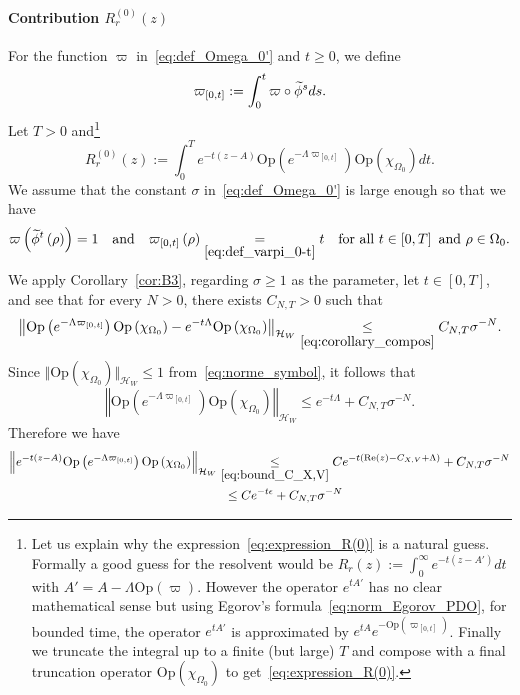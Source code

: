 \documentclass[AHL,Unicode,longabstracts,published]{cedram}
\newcommand{\clH}{\mathcal{H}}
\newcommand{\Ree}{\mathrm{Re}}
\newcommand{\Opp}{\mathrm{Op}}
\let\oldtilde\tilde
\renewcommand*{\tilde}[1]{\mathchoice{\widetilde{#1}}{\widetilde{#1}}{\oldtilde{#1}}{\oldtilde{#1}}}
\newcommand{\Ree}{\mathrm{Re}}
\newcommand{\clH}{\mathcal{H}}
\begin{document}
\paragraph{Contribution $R_{r}^{(0)}(z)$}\label{par:Contribution}

For the function $\varpi$ in~\eqref{eq:def_Omega_0'} and $t\geq0$, we define
\begin{equation}\label{eq:def_varpi_0-t}
\varpi_{\left[0,t\right]}:=\int_{0}^{t}\varpi\circ\tilde{\phi}^{s}ds.
\end{equation}
Let $T>0$ and\footnote{Let us explain why the expression~\eqref{eq:expression_R(0)} is a natural guess. Formally a good guess for the resolvent would be $R_{r}(z):=\int_{0}^{\infty}e^{-t(z-A')}dt$ with $A'=A-\Lambda\Opp (\varpi)$. However the operator $e^{tA'}$ has no clear mathematical sense but using Egorov's formula~\eqref{eq:norm_Egorov_PDO}, for bounded time, the operator $e^{tA'}$ is approximated by $e^{tA}e^{-\Opp (\varpi_{[0,t]})}$. Finally we truncate the integral up to a finite (but large) $T$ and compose with a final truncation operator $\Opp (\chi_{\Omega_{0}})$ to get~\eqref{eq:expression_R(0)}.}
\begin{equation}\label{eq:expression_R(0)}
R_{r}^{\left(0\right)}\left(z\right):=\int_{0}^{T}e^{-t\left(z-A\right)}\Opp \left(e^{-\Lambda\varpi_{\left[0,t\right]}}\right)\Opp \left(\chi_{\Omega_{0}}\right)dt.
\end{equation}
We assume that the constant $\sigma$ in~\eqref{eq:def_Omega_0'} is large enough so that we have
\[
\varpi\left(\tilde{\phi}^{t}\left(\rho\right)\right)=1\quad\text{and}\quad\varpi_{\left[0,t\right]}\left(\rho\right)\underset{\eqref{eq:def_varpi_0-t}}{=}t\quad\text{for all }t\in\left[0,T\right]\text{ and }\rho\in\Omega_{0}.
\]
We apply Corollary~\ref{cor:B3}, regarding $\sigma\geq1$ as the parameter, let $t\in[0,T]$, and see that for every $N>0$, there exists $C_{N,T}>0$ such that
\[
\left\Vert \Opp \left(e^{-\Lambda\varpi_{\left[0,t\right]}}\right)\Opp \left(\chi_{\Omega_{0}}\right)-e^{-t\Lambda}\Opp \left(\chi_{\Omega_{0}}\right)\right\Vert _{\clH _{W}}\underset{\eqref{eq:corollary_compos}}{\leq}C_{N,T}\sigma^{-N}.
\]
Since $\Vert \Opp (\chi_{\Omega_{0}})\Vert _{\clH _{W}}\leq1$ from~\eqref{eq:norme_symbol}, it follows that
\[
\left\Vert \Opp \left(e^{-\Lambda\varpi_{\left[0,t\right]}}\right)\Opp \left(\chi_{\Omega_{0}}\right)\right\Vert _{\clH _{W}}\leq e^{-t\Lambda}+C_{N,T}\sigma^{-N}.
\]
Therefore we have
\begin{equation}\label{eq:res5}
\begin{split}
\left\Vert e^{-t\left(z-A\right)}\Opp \left(e^{-\Lambda\varpi_{\left[0,t\right]}}\right)\Opp \left(\chi_{\Omega_{0}}\right)\right\Vert _{\clH _{W}} & \underset{\eqref{eq:bound_C_X,V}}{\leq}Ce^{-t\left(\Ree\left(z\right)-C_{X,V}+\Lambda\right)}+C_{N,T}\sigma^{-N}\\
& \mkern10mu\le Ce^{-t\epsilon}+C_{N,T}\sigma^{-N}
\end{split}
\end{equation}
\end{document}
